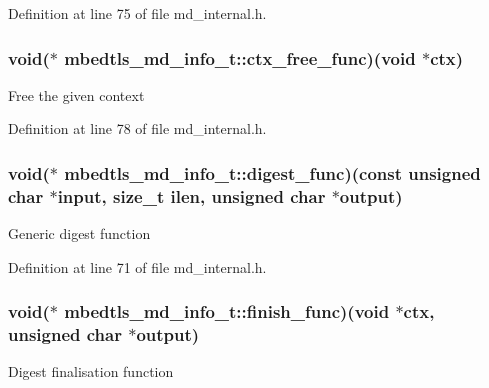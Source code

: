 Definition at line 75 of file md\-\_\-internal.\-h.

\hypertarget{structmbedtls__md__info__t_a208baa42f9678bd4668636ae96c3e151}{
\subsubsection[{ctx\-\_\-free\-\_\-func}]{\setlength{\rightskip}{0pt plus 5cm}void($\ast$ mbedtls\-\_\-md\-\_\-info\-\_\-t\-::ctx\-\_\-free\-\_\-func)(void $\ast$ctx)}}\label{structmbedtls__md__info__t_a208baa42f9678bd4668636ae96c3e151}
Free the given context 

Definition at line 78 of file md\-\_\-internal.\-h.

\hypertarget{structmbedtls__md__info__t_a1f6293aafcd824caef39ed3daf75f0b4}{
\subsubsection[{digest\-\_\-func}]{\setlength{\rightskip}{0pt plus 5cm}void($\ast$ mbedtls\-\_\-md\-\_\-info\-\_\-t\-::digest\-\_\-func)(const unsigned char $\ast$input, size\-\_\-t ilen, unsigned char $\ast$output)}}\label{structmbedtls__md__info__t_a1f6293aafcd824caef39ed3daf75f0b4}
Generic digest function 

Definition at line 71 of file md\-\_\-internal.\-h.

\hypertarget{structmbedtls__md__info__t_aa4318bc22c60d0e37dc976ac9ad2f704}{
\subsubsection[{finish\-\_\-func}]{\setlength{\rightskip}{0pt plus 5cm}void($\ast$ mbedtls\-\_\-md\-\_\-info\-\_\-t\-::finish\-\_\-func)(void $\ast$ctx, unsigned char $\ast$output)}}\label{structmbedtls__md__info__t_aa4318bc22c60d0e37dc976ac9ad2f704}
Digest finalisation function 

